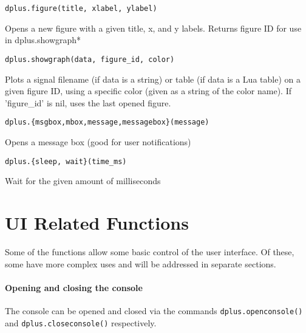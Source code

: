 \documentclass[../D+Manual.tex]{subfiles}
\begin{document}
\begin{lstlisting}
dplus.figure(title, xlabel, ylabel)
\end{lstlisting}
Opens a new figure with a given title, x, and y labels. Returns figure ID for use in dplus.showgraph*

\begin{lstlisting}
dplus.showgraph(data, figure_id, color)
\end{lstlisting}
Plots a signal filename (if data is a string) or table (if data is a Lua table) on a given figure ID, using a specific color (given as a string of the color name). If 'figure\_id' is nil, uses the last opened figure.

\begin{lstlisting}
dplus.{msgbox,mbox,message,messagebox}(message)
\end{lstlisting}
Opens a message box (good for user notifications)

\begin{lstlisting}
dplus.{sleep, wait}(time_ms)
\end{lstlisting}
Wait for the given amount of milliseconds


\section{UI Related Functions}

Some of the functions allow some basic control of the user interface. Of these, some have more complex uses and will be addressed in separate sections.

\paragraph{Opening and closing the console}
\begin{sloppypar}
The console can be opened and closed via the commands \lstinline|dplus.openconsole()| and \lstinline|dplus.closeconsole()| respectively.
\end{sloppypar}
\end{document}
